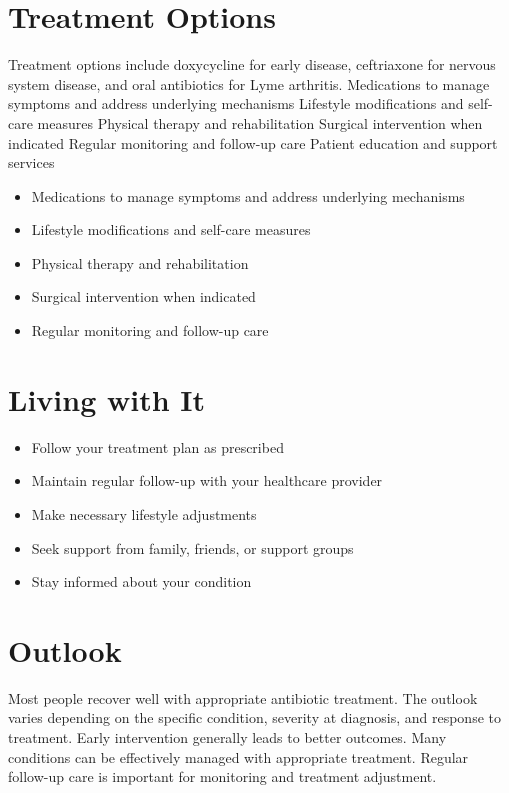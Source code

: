 \section{Treatment Options}
Treatment options include doxycycline for early disease, ceftriaxone for nervous system disease, and oral antibiotics for Lyme arthritis. Medications to manage symptoms and address underlying mechanisms Lifestyle modifications and self-care measures Physical therapy and rehabilitation Surgical intervention when indicated Regular monitoring and follow-up care Patient education and support services

\begin{itemize}[noitemsep]
  \item Medications to manage symptoms and address underlying mechanisms
  \item Lifestyle modifications and self-care measures
  \item Physical therapy and rehabilitation
  \item Surgical intervention when indicated
  \item Regular monitoring and follow-up care
\end{itemize}
\section{Living with It}
\begin{itemize}[noitemsep]
  \item Follow your treatment plan as prescribed
  \item Maintain regular follow-up with your healthcare provider
  \item Make necessary lifestyle adjustments
  \item Seek support from family, friends, or support groups
  \item Stay informed about your condition
\end{itemize}
\section{Outlook}
Most people recover well with appropriate antibiotic treatment. The outlook varies depending on the specific condition, severity at diagnosis, and response to treatment. Early intervention generally leads to better outcomes. Many conditions can be effectively managed with appropriate treatment. Regular follow-up care is important for monitoring and treatment adjustment.
